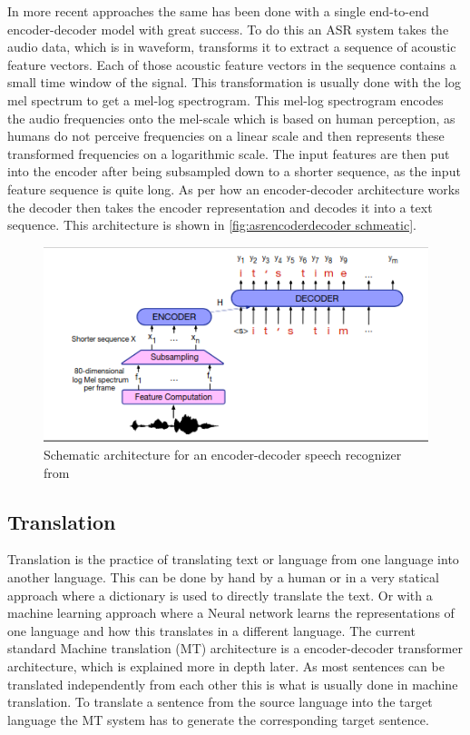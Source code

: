 In more recent approaches the same has been done with a single end-to-end encoder-decoder model with great success. 
To do this an ASR system takes the audio data, which is in waveform, transforms it to extract a sequence of acoustic feature vectors. 
Each of those acoustic feature vectors in the sequence contains a small time window of the signal. 
This transformation is usually done with the log mel spectrum to get a mel-log spectrogram. \cite[chapter~16]{jm3}
This mel-log spectrogram encodes the audio frequencies onto the mel-scale which is based on human perception, as humans do not perceive frequencies on a linear scale \cite{mellogscale} and then represents these transformed frequencies on a logarithmic scale. 
The input features are then put into the encoder after being subsampled down to a shorter sequence, as the input feature sequence is quite long. 
As per how an encoder-decoder architecture works the decoder then takes the encoder representation and decodes it into a text sequence. 
This architecture is shown in \autoref{fig:asrencoderdecoder schmeatic}.
\begin{figure}[h]
    \centering
    \includegraphics[width=\linewidth]{Latex//sections//images/asrencoderdecoder.png}
    \caption{Schematic architecture for an encoder-decoder speech recognizer from \cite{jm3}}
    \label{fig:asrencoderdecoder schmeatic}
\end{figure}


\subsection{Translation}
Translation is the practice of translating text or language from one language into another language. 
This can be done by hand by a human or in a very statical approach where a dictionary is used to directly translate the text. 
Or with a machine learning approach where a Neural network learns the representations of one language and how this translates in a different language. 
The current standard Machine translation (MT) architecture is a encoder-decoder transformer architecture, which is explained more in depth later. 
As most sentences can be translated independently from each other this is what is usually done in machine translation. To translate a sentence from the source language into the target language the MT system has to generate the corresponding target sentence. \cite[chapter~13.2]{jm3}

